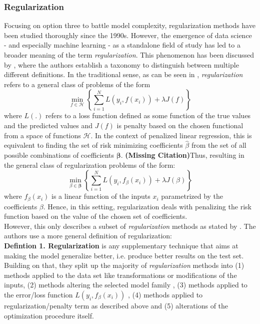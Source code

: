 \documentclass[12pt,a4paper]{article}
\newcommand{\MC}{\textbf{(Missing Citation)}} %
\begin{document}
\subsubsection{Regularization}

Focusing on option three to battle model complexity, regularization methods have been studied thoroughly since the 1990s. However, the emergence of data science - and especially machine learning - as a standalone field of study has led to a broader meaning of the term \textit{regularization}. This phenomenon has been discussed by \textcite{Taxonomy2017}, where the authors establish a taxonomy to distinguish between multiple different definitions. In the traditional sense, as can be seen in \textcite[167--170]{ESL2009}, \textit{regularization} refers to a general class of problems of the form
\[
\underset{f \in \mathcal{H}}{\min}\left\{\sum_{i=1}^N L(y_i, f(x_i)) + \lambda{J}(f)\right\}
\]
where $L(.)$ refers to a loss function defined as some function of the true values and the predicted values and $J(f)$ is penalty based on the chosen functional from a space of functions $\mathcal{H}$. In the context of penalized linear regression, this is equivalent to finding the set of risk minimizing coefficients $\hat{\beta}$ from the set of all possible combinations of coefficients $\boldsymbol{\beta}$. \MC Thus, resulting in the general class of regularization problems of the form:
\[
\underset{\beta \in \boldsymbol{\beta}}{\min}\left\{\sum_{i=1}^N L(y_i, f_\beta(x_i)) + \lambda{J}(\beta)\right\}
\]
where $f_\beta(x_i)$ is a linear function of the inputs $x_i$ parametrized by the coefficients $\beta$. Hence, in this setting, regularization deals with penalizing the risk function based on the value of the chosen set of coefficients. \\
However, this only describes a subset of \textit{regularization} methods as stated by \textcite{Taxonomy2017}. The authors use a more general definition of regularization:\\

\textbf{Defintion 1. Regularization} is any supplementary technique that aims at making the model generalize better, i.e. produce better results on the test set.\\

Building on that, they split up the majority of \textit{regularization} methods into  (1) methods applied to the data set like transformations or modifications of the inputs, (2) methods altering the selected model family , (3) methods applied to the error/loss function $L(y_i, f_\beta(x_i))$ , (4) methods applied to regularization/penalty term as described above and (5) alterations of the optimization procedure itself. 
\end{document}
